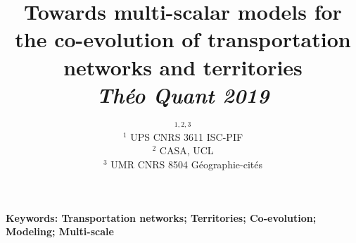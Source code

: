 




\title{\vspace{-2.5cm}Towards multi-scalar models for the co-evolution of transportation networks and territories\\\medskip
\textit{Théo Quant 2019}\\
}
\author{$^{1,2,3}$\\
$^1$ UPS CNRS 3611 ISC-PIF\\
$^2$ CASA, UCL\\
$^3$ UMR CNRS 8504 Géographie-cités
}
\date{}

\maketitle

\justify


\begin{abstract}
\end{abstract}


\vspace{-1cm}

\textbf{Keywords: Transportation networks; Territories; Co-evolution; Modeling; Multi-scale}

\bigskip

